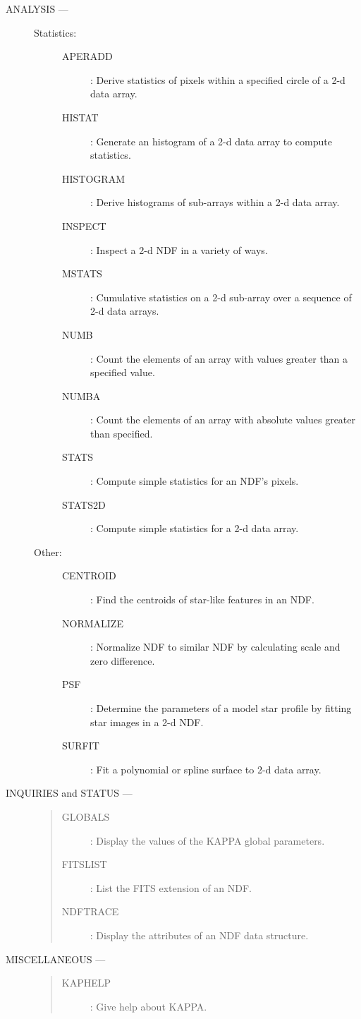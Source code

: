 \begin{description}
\item [ANALYSIS ---]
\begin{description}
\item [Statistics:]\hfill
\begin{description}
\item [APERADD]:
 Derive statistics of pixels within a specified circle of a 2-d data array.
\item [HISTAT]:
 Generate an histogram of a 2-d data array to compute statistics.
\item [HISTOGRAM]:
 Derive histograms of sub-arrays within a 2-d data array.
\item [INSPECT]:
 Inspect a 2-d NDF in a variety of ways.
\item [MSTATS]:
 Cumulative statistics on a 2-d sub-array over a sequence of 2-d data arrays.
\item [NUMB]:
 Count the elements of an array with values greater than a specified value.
\item [NUMBA]:
 Count the elements of an array with absolute values greater than specified.
\item [STATS]:
 Compute simple statistics for an NDF's pixels.
\item [STATS2D]:
 Compute simple statistics for a 2-d data array.
\end{description}
\item [Other:]\hfill
\begin{description}
\item [CENTROID]:
 Find the centroids of star-like features in an NDF.
\item [NORMALIZE]:
 Normalize NDF to similar NDF by calculating scale and zero difference.
\item [PSF]:
 Determine the parameters of a model star profile by fitting star images in a
 2-d NDF.
\item [SURFIT]:
 Fit a polynomial or spline surface to 2-d data array.
\end {description}
\end {description}

\item [INQUIRIES and STATUS ---]
\begin {quote}
\begin {description}
\item [GLOBALS]:
 Display the values of the KAPPA global parameters.
\item [FITSLIST]:
 List the FITS extension of an NDF.
\item [NDFTRACE]:
 Display the attributes of an NDF data structure.
\end {description}
\end {quote}

\item [MISCELLANEOUS ---]
\begin {quote}
\begin {description}
\item [KAPHELP]:
 Give help about KAPPA.
\end {description}
\end {quote}
\end {description}

